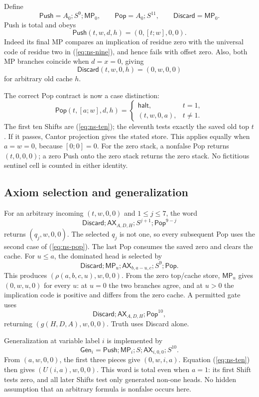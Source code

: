 Define
\[
 \mathsf{Push}=A_0;S^9;\mathsf{MP}_0,\qquad
 \mathsf{Pop}=A_0;S^{11},\qquad
 \mathsf{Discard}=\mathsf{MP}_0.
\]
Push is total and obeys
\[
 \mathsf{Push}(t,w,d,h)=(0,[t;w],0,0).
\]
Indeed its final MP compares an implication of residue zero with the
universal code of residue two in (\ref{eq:ns-nine}), and hence fails with
offset zero. Also, both MP branches coincide when $d=x=0$, giving
\[
 \mathsf{Discard}(t,w,0,h)=(0,w,0,0)
\]
for arbitrary old cache $h$.

The correct Pop contract is now a case distinction:
\begin{equation}
 \mathsf{Pop}(t,[a;w],d,h)=
 \begin{cases}
 \mathsf{halt},&t=1,\\
 (t,w,0,a),&t\ne1.
 \end{cases}\label{eq:ns-pop}
\end{equation}
The first ten Shifts are (\ref{eq:ns-ten}); the eleventh tests exactly the
saved old top $t$. If it passes, Cantor projection gives the stated
store. This applies equally when $a=w=0$, because $[0;0]=0$.
For the zero stack, a nonfalse Pop returns $(t,0,0,0)$; a zero Push onto
the zero stack returns the zero stack. No fictitious sentinel cell is
counted in either identity.

\subsection{Axiom selection and generalization}

For an arbitrary incoming $(t,w,0,0)$ and $1\le j\le7$, the word
\[
 \mathsf{Discard};\mathsf{AX}_{A,D,H};S^{j+1};
                  \mathsf{Pop}^{9-j}
\]
returns $(q_j,w,0,0)$. The selected $q_j$ is not one, so every subsequent
Pop uses the second case of (\ref{eq:ns-pop}). The last Pop consumes the
saved zero and clears the cache. For $u\le a$, the dominated head is
selected by
\[
 \mathsf{Discard};\mathsf{MP}_u;
 \mathsf{AX}_{b,a-u,c};S^9;\mathsf{Pop}.
\]
This produces $(\rho(a,b,c,u),w,0,0)$. From the zero top/cache store,
$\mathsf{MP}_u$ gives $(0,w,u,0)$ for every $u$: at $u=0$ the two branches
agree, and at $u>0$ the implication code is positive and differs from the
zero cache. A permitted gate uses
\[
 \mathsf{Discard};\mathsf{AX}_{A,D,H};\mathsf{Pop}^{10},
\]
returning $(g(H,D,A),w,0,0)$. Truth uses Discard alone.

Generalization at variable label $i$ is implemented by
\[
 \mathsf{Gen}_i=\mathsf{Push};\mathsf{MP}_i;S;
                    \mathsf{AX}_{i,0,0};S^{10}.
\]
From $(a,w,0,0)$, the first three pieces give $(0,w,i,a)$.
Equation (\ref{eq:ns-ten}) then gives $(U(i,a),w,0,0)$.
This word is total even when $a=1$: its first Shift tests zero, and all
later Shifts test only generated non-one heads. No hidden assumption that
an arbitrary formula is nonfalse occurs here.

